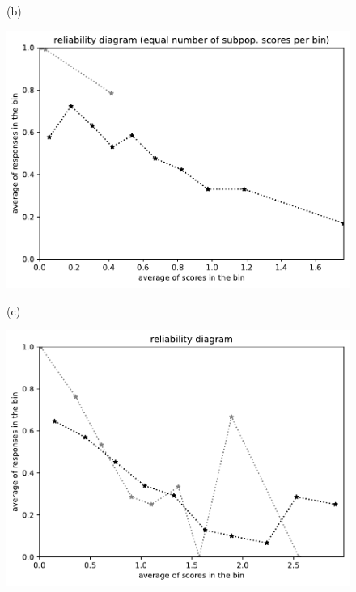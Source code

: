 \documentclass{article}
\newlength{\vertsep}
\newlength{\imsize}
\begin{document}
\begin{figure}
\begin{centering}
(b)
\parbox{\imsize}{\includegraphics[width=\imsize]
{../codes/unweighted/nll-1-60-night-snake-Hypsiglena-torquata_323-monarch-monarch-butterfly-milkweed-butterfly-Danaus-plexippusequisamps10.pdf}}
\quad\quad
(c)
\parbox{\imsize}{\includegraphics[width=\imsize]
{../codes/unweighted/nll-1-60-night-snake-Hypsiglena-torquata_323-monarch-monarch-butterfly-milkweed-butterfly-Danaus-plexippusequiscore10.pdf}}

\vspace{\vertsep}


\end{centering}
\end{figure}
\end{document}
